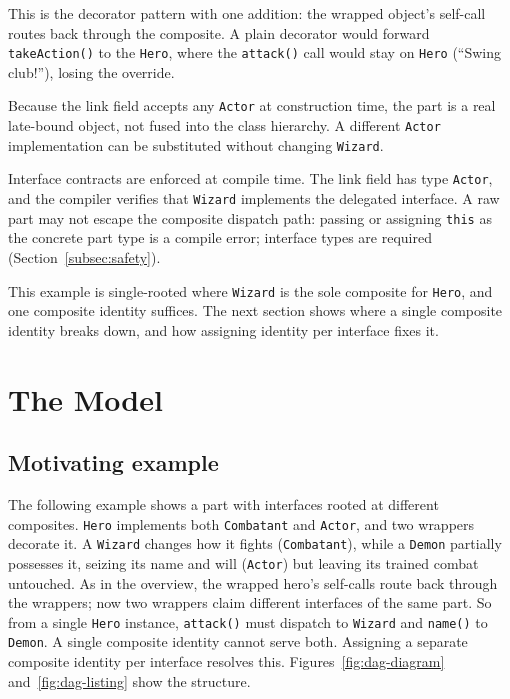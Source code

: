 \documentclass[acmsmall,screen,review,anonymous]{acmart}
\theoremstyle{acmplain}
\newcommand{\code}[1]{\texttt{#1}}
\begin{document}
This is the decorator pattern with one addition: the wrapped object's self-call
routes back through the composite. A plain decorator would forward
\code{takeAction()} to the \code{Hero}, where the \code{attack()} call would stay on
\code{Hero} (``Swing club!''), losing the override.

Because the link field accepts any \code{Actor} at construction
time, the part is a real late-bound object, not fused into the class
hierarchy. A different \code{Actor} implementation can be substituted
without changing \code{Wizard}.

Interface contracts are enforced at compile time. The link field has
type \code{Actor}, and the compiler verifies that \code{Wizard}
implements the delegated interface. A raw part may not escape the
composite dispatch path: passing or assigning \code{this} as the concrete
part type is a compile error; interface types are required (Section~\ref{subsec:safety}).

This example is single-rooted where \code{Wizard} is the sole composite for \code{Hero}, and one composite identity suffices.
The next section shows where a single composite identity breaks down, and how assigning identity per interface fixes it.

\section{The Model}
\label{sec:model}

\subsection{Motivating example}

The following example shows a part with interfaces rooted at different
composites. \code{Hero} implements both \code{Combatant} and \code{Actor},
and two wrappers decorate it. A \code{Wizard} changes how it fights
(\code{Combatant}), while a \code{Demon} partially possesses it, seizing its name
and will (\code{Actor}) but leaving its trained combat untouched. As in the
overview, the wrapped hero's self-calls route back through the wrappers; now two
wrappers claim different interfaces of the same part. So from a single \code{Hero}
instance, \code{attack()} must dispatch to \code{Wizard} and \code{name()}
to \code{Demon}. A single composite identity cannot serve both. Assigning a
separate composite identity per interface resolves this.
Figures~\ref{fig:dag-diagram} and~\ref{fig:dag-listing} show the structure.
\end{document}
